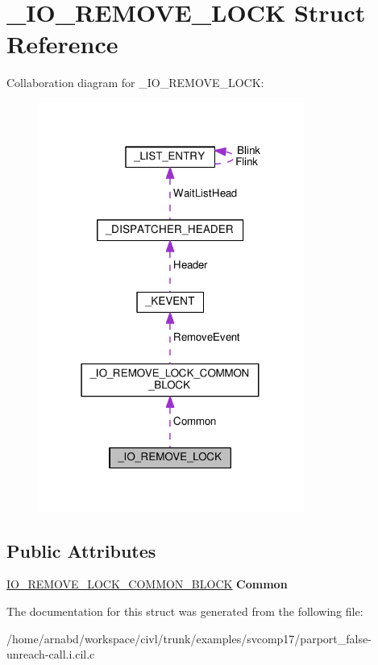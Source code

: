 \hypertarget{struct__IO__REMOVE__LOCK}{}\section{\+\_\+\+I\+O\+\_\+\+R\+E\+M\+O\+V\+E\+\_\+\+L\+O\+C\+K Struct Reference}
\label{struct__IO__REMOVE__LOCK}


Collaboration diagram for \+\_\+\+I\+O\+\_\+\+R\+E\+M\+O\+V\+E\+\_\+\+L\+O\+C\+K\+:
\nopagebreak
\begin{figure}[H]
\begin{center}
\leavevmode
\includegraphics[width=247pt]{struct__IO__REMOVE__LOCK__coll__graph}
\end{center}
\end{figure}
\subsection*{Public Attributes}
\begin{DoxyCompactItemize}
\item 
\hypertarget{struct__IO__REMOVE__LOCK_ae34227a85b13b14731db23a21a59900d}{}\hyperlink{struct__IO__REMOVE__LOCK__COMMON__BLOCK}{I\+O\+\_\+\+R\+E\+M\+O\+V\+E\+\_\+\+L\+O\+C\+K\+\_\+\+C\+O\+M\+M\+O\+N\+\_\+\+B\+L\+O\+C\+K} {\bfseries Common}\label{struct__IO__REMOVE__LOCK_ae34227a85b13b14731db23a21a59900d}

\end{DoxyCompactItemize}


The documentation for this struct was generated from the following file\+:\begin{DoxyCompactItemize}
\item 
/home/arnabd/workspace/civl/trunk/examples/svcomp17/parport\+\_\+false-\/unreach-\/call.\+i.\+cil.\+c\end{DoxyCompactItemize}

